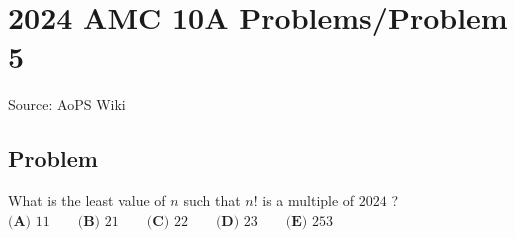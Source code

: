 \documentclass[12pt]{article}
\begin{document}
\section*{{2024 AMC 10A Problems/Problem 5}}
Source: AoPS Wiki

\subsection*{Problem}
What is the least value of $n$ such that $n!$ is a multiple of $2024$ ? $\textbf{(A) } 11\qquad\textbf{(B) } 21\qquad\textbf{(C) } 22\qquad\textbf{(D) } 23\qquad\textbf{(E) } 253$
\end{document}
